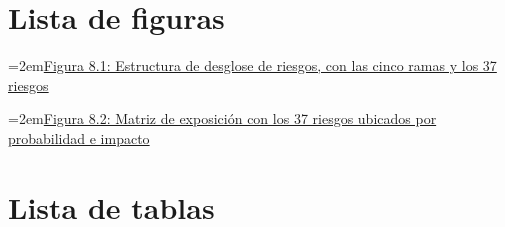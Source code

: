 \documentclass[11pt]{article}
\begin{document}
\tableofcontents
\clearpage

\section*{Lista de figuras}

\noindent\hangindent=2em\hyperref[fig:8-1]{Figura 8.1: Estructura de desglose de riesgos, con las cinco ramas y los 37 riesgos}\dotfill\pageref{fig:8-1}\par\vspace{0.4\baselineskip}
\noindent\hangindent=2em\hyperref[fig:8-2]{Figura 8.2: Matriz de exposición con los 37 riesgos ubicados por probabilidad e impacto}\dotfill\pageref{fig:8-2}\par\vspace{0.4\baselineskip}
\clearpage
\section*{Lista de tablas}
\end{document}
